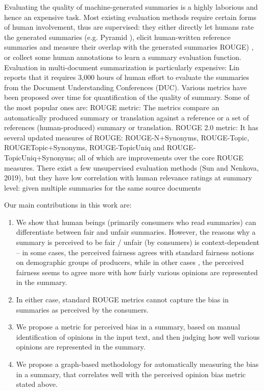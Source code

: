 Evaluating the quality of machine-generated summaries is a highly laborious and hence an expensive task. Most existing evaluation methods require certain forms of human involvement, thus are supervised: they either directly let humans rate the generated summaries (e.g. Pyramid \cite{nenkova2004evaluating}), elicit human-written reference summaries and measure their overlap with the generated summaries  ROUGE\cite{lin2004looking}) , or collect some human annotations\cite{gao2019preference} to learn a summary evaluation function. Evaluation in multi-document summarization is particularly expensive: Lin\cite{lin2004rouge} reports that it requires 3,000 hours of human effort to evaluate the summaries from the Document Understanding Conferences (DUC). 
Various metrics have been proposed over time for quantification of the quality of summary. Some of the most popular ones are:
ROUGE metric: The metrics compare an automatically produced summary or translation against a reference or a set of references (human-produced) summary or translation. 
ROUGE 2.0 metric: It has several updated measures of ROUGE: ROUGE-N+Synonyms, ROUGE-Topic, ROUGETopic+Synonyms, ROUGE-TopicUniq and ROUGE-TopicUniq+Synonyms; all of which are improvements over the core ROUGE measures.
 There exist a few unsupervised evaluation methods (Sun and Nenkova, 2019\cite{sun2019feasibility}), but they have low correlation with human relevance ratings at summary level: given multiple summaries for the same source documents

Our main contributions in this work are:
\begin{enumerate}
 \item We show that human beings (primarily consumers who read summaries) can differentiate between fair and unfair summaries. However, the reasons why a summary is perceived to be fair / unfair  (by consumers) is context-dependent -- in some cases, the perceived fairness agrees with standard fairness notions on demographic groups of producers, while in other cases , the perceived fairness seems to agree more with how fairly various opinions are represented in the summary.
 \item In either case, standard ROUGE metrics cannot capture the bias in summaries as perceived by the consumers.
\item We propose a metric for perceived bias in a summary, based on manual identification of opinions in the input text, and then judging how well various opinions are represented in the summary.
\item We propose a graph-based methodology for automatically measuring the bias in a summary, that correlates well with the perceived opinion bias metric stated above.
\end{enumerate}
\fi 